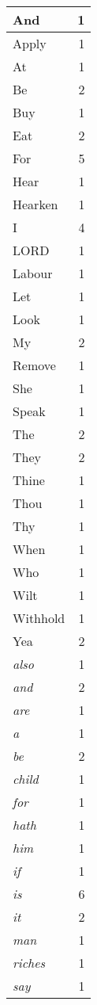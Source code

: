 \begin{center}
\begin{longtable}{l|r}
And & 1\\ \hline 
Apply & 1\\ \hline 
At & 1\\ \hline 
Be & 2\\ \hline 
Buy & 1\\ \hline 
Eat & 2\\ \hline 
For & 5\\ \hline 
Hear & 1\\ \hline 
Hearken & 1\\ \hline 
I & 4\\ \hline 
LORD & 1\\ \hline 
Labour & 1\\ \hline 
Let & 1\\ \hline 
Look & 1\\ \hline 
My & 2\\ \hline 
Remove & 1\\ \hline 
She & 1\\ \hline 
Speak & 1\\ \hline 
The & 2\\ \hline 
They & 2\\ \hline 
Thine & 1\\ \hline 
Thou & 1\\ \hline 
Thy & 1\\ \hline 
When & 1\\ \hline 
Who & 1\\ \hline 
Wilt & 1\\ \hline 
Withhold & 1\\ \hline 
Yea & 2\\ \hline 
\emph{also} & 1\\ \hline 
\emph{and} & 2\\ \hline 
\emph{are} & 1\\ \hline 
\emph{a} & 1\\ \hline 
\emph{be} & 2\\ \hline 
\emph{child} & 1\\ \hline 
\emph{for} & 1\\ \hline 
\emph{hath} & 1\\ \hline 
\emph{him} & 1\\ \hline 
\emph{if} & 1\\ \hline 
\emph{is} & 6\\ \hline 
\emph{it} & 2\\ \hline 
\emph{man} & 1\\ \hline 
\emph{riches} & 1\\ \hline 
\emph{say} & 1\\ \hline 

\end{longtable}
\end{center}
